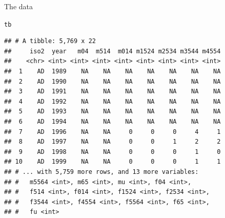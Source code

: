 \documentclass[unknownkeysallowed]{beamer}\usepackage[]{graphicx}\usepackage[]{color}
\makeatletter
\newcommand{\hlopt}[1]{\textcolor[rgb]{0,0,0}{#1}}%
\newcommand{\hlstd}[1]{\textcolor[rgb]{0.345,0.345,0.345}{#1}}%
\newcommand{\hlkwb}[1]{\textcolor[rgb]{0.69,0.353,0.396}{#1}}%
\newcommand{\hlkwc}[1]{\textcolor[rgb]{0.333,0.667,0.333}{#1}}%
\newcommand{\hlkwd}[1]{\textcolor[rgb]{0.737,0.353,0.396}{\textbf{#1}}}%
\newenvironment{kframe}{%
 \def\at@end@of@kframe{}%
 \ifinner\ifhmode%
  \def\at@end@of@kframe{\end{minipage}}%
  \begin{minipage}{\columnwidth}%
 \fi\fi%
 \def\FrameCommand##1{\hskip\@totalleftmargin \hskip-\fboxsep
 \colorbox{shadecolor}{##1}\hskip-\fboxsep
     \hskip-\linewidth \hskip-\@totalleftmargin \hskip\columnwidth}%
 \MakeFramed {\advance\hsize-\width
   \@totalleftmargin\z@ \linewidth\hsize
   \@setminipage}}%
 {\par\unskip\endMakeFramed%
 \at@end@of@kframe}
\newenvironment{knitrout}{}{} %
\makeatother
\begin{document}
\begin{frame}[fragile]{The data}

\begin{knitrout}\footnotesize
{}\color{fgcolor}\begin{kframe}
\begin{alltt}
\hlstd{tb}
\end{alltt}
\begin{verbatim}
## # A tibble: 5,769 x 22
##     iso2  year   m04  m514  m014 m1524 m2534 m3544 m4554
##    <chr> <int> <int> <int> <int> <int> <int> <int> <int>
##  1    AD  1989    NA    NA    NA    NA    NA    NA    NA
##  2    AD  1990    NA    NA    NA    NA    NA    NA    NA
##  3    AD  1991    NA    NA    NA    NA    NA    NA    NA
##  4    AD  1992    NA    NA    NA    NA    NA    NA    NA
##  5    AD  1993    NA    NA    NA    NA    NA    NA    NA
##  6    AD  1994    NA    NA    NA    NA    NA    NA    NA
##  7    AD  1996    NA    NA     0     0     0     4     1
##  8    AD  1997    NA    NA     0     0     1     2     2
##  9    AD  1998    NA    NA     0     0     0     1     0
## 10    AD  1999    NA    NA     0     0     0     1     1
## # ... with 5,759 more rows, and 13 more variables:
## #   m5564 <int>, m65 <int>, mu <int>, f04 <int>,
## #   f514 <int>, f014 <int>, f1524 <int>, f2534 <int>,
## #   f3544 <int>, f4554 <int>, f5564 <int>, f65 <int>,
## #   fu <int>
\end{verbatim}
\end{kframe}
\end{knitrout}
  
\end{frame}

\end{document}
